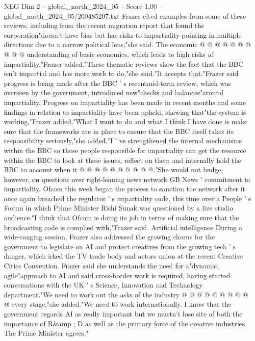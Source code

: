 \begin{textsample}{NEG Dim 2 – global\_north\_2024\_05 – Score 1.00 – global\_north\_2024\_05/200485207.txt}
Frazer cited examples from some of these reviews, including from the recent migration report that found the corporation"doesn't have bias but has risks to impartiality pointing in multiple directions due to a narrow political lens,"she said.
The economic @ @ @ @ @ @ @ @ @ @ understanding of basic economics, which leads to high risks of impartiality,"Frazer added."These thematic reviews show the fact that the BBC isn't impartial and has more work to do,"she said."It accepts that."Frazer said progress is being made after the BBC ' s recentmid-term review, which was overseen by the government, introduced new"checks and balances"around impartiality.
Progress on impartiality has been made in recent months and some findings in relation to impartiality have been upheld, showing that"the system is working,"Frazer added."What I want to do and what I think I have done is make sure that the frameworks are in place to ensure that the BBC itself takes its responsibility seriously,"she added."I ' ve strengthened the internal mechanisms within the BBC so those people responsible for impartiality can get the resource within the BBC to look at these issues, reflect on them and internally hold the BBC to account when it @ @ @ @ @ @ @ @ @ @."She would not budge, however, on questions over right-leaning news network GB News ' commitment to impartiality.
Ofcom this week began the process to sanction the network after it once again breached the regulator ' s impartiality code, this time over a People ' s Forum in which Prime Minister Rishi Sunak was questioned by a live studio audience."I think that Ofcom is doing its job in terms of making sure that the broadcasting code is complied with,"Frazer said.
Artificial intelligence During a wide-ranging session, Frazer also addressed the growing chorus for the government to legislate on AI and protect creatives from the growing tech ' s danger, which irked the TV trade body and actors union at the recent Creative Cities Convention.
Frazer said she understands the need for a"dynamic, agile"approach to AI and said cross-border work is required, having started conversations with the UK ' s Science, Innovation and Technology department."We need to work out the asks of the industry @ @ @ @ @ @ @ @ @ @ every stage,"she added."We need to work internationally.
I know that the government regards AI as really important but we mustn't lose site of both the importance of R\&amp ; D as well as the primary force of the creative industries.
The Prime Minister agrees."

\end{textsample}
